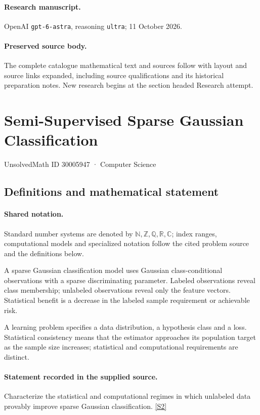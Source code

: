 \documentclass[11pt]{article}
\begin{document}
\paragraph{Research manuscript.} OpenAI \texttt{gpt-6-astra}, reasoning \texttt{ultra}; 11 October 2026.
\paragraph{Preserved source body.} The complete catalogue mathematical text and sources follow with layout and source links expanded, including source qualifications and its historical preparation notes. New research begins at the section headed Research attempt.

\section{Semi-Supervised Sparse Gaussian Classification}\label{30005947}
{\small UnsolvedMath ID 30005947 · Computer Science}
\subsection{Definitions and mathematical statement}

\paragraph{Shared notation.}Standard number systems are denoted by $\mathbb N,\mathbb Z,\mathbb Q,\mathbb R,\mathbb C$; index ranges, computational models and specialized notation follow the cited problem source and the definitions below.


A sparse Gaussian classification model uses Gaussian class-conditional observations with a sparse discriminating parameter. Labeled observations reveal class membership; unlabeled observations reveal only the feature vectors. Statistical benefit is a decrease in the labeled sample requirement or achievable risk.

A learning problem specifies a data distribution, a hypothesis class and a loss. Statistical consistency means that the estimator approaches its population target as the sample size increases; statistical and computational requirements are distinct.
\paragraph{Statement recorded in the supplied source.}
Characterize the statistical and computational regimes in which unlabeled data provably improve sparse Gaussian classification. \href{https://doi.org/10.4171/owr/2024/30}{[S2]}
\end{document}
